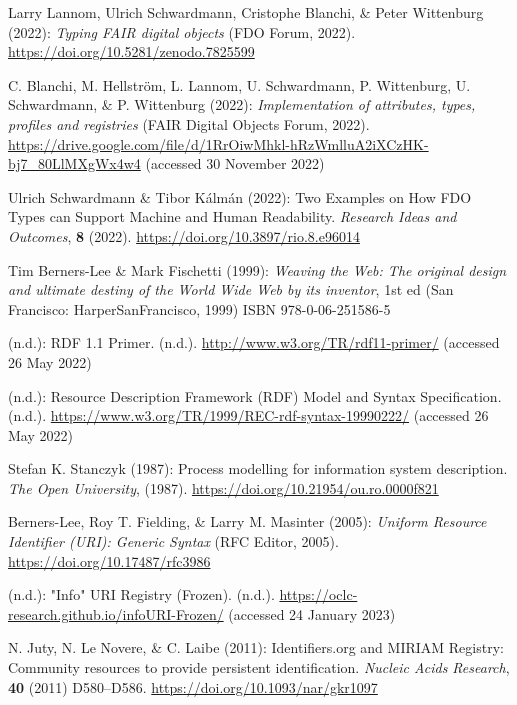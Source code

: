 \begin{thebibliography}{9}
Larry Lannom, Ulrich Schwardmann, Cristophe Blanchi, \& Peter Wittenburg
(2022): \emph{Typing {FAIR} digital objects} ({FDO Forum}, 2022).
\url{https://doi.org/10.5281/zenodo.7825599}

C. Blanchi, M. Hellström, L. Lannom, U. Schwardmann, P. Wittenburg, U.
Schwardmann, \& P. Wittenburg (2022): \emph{Implementation of
attributes, types, profiles and registries} ({FAIR Digital Objects
Forum}, 2022).
\url{https://drive.google.com/file/d/1RrOiwMhkl-hRzWmlluA2iXCzHK-bj7_80LlMXgWx4w4}
(accessed 30 November 2022)

Ulrich Schwardmann \& Tibor Kálmán (2022): Two {Examples} on {How FDO
Types} can {Support Machine} and {Human Readability}. \emph{Research
Ideas and Outcomes}, \textbf{8} (2022).
\url{https://doi.org/10.3897/rio.8.e96014}

Tim Berners-Lee \& Mark Fischetti (1999): \emph{Weaving the {Web}: The
original design and ultimate destiny of the {World Wide Web} by its
inventor}, 1st ed ({San Francisco}: {HarperSanFrancisco}, 1999) ISBN
978-0-06-251586-5

(n.d.): {RDF} 1.1 {Primer}. (n.d.).
\url{http://www.w3.org/TR/rdf11-primer/} (accessed 26 May 2022)

(n.d.): Resource {Description Framework} ({RDF}) {Model} and {Syntax
Specification}. (n.d.).
\url{https://www.w3.org/TR/1999/REC-rdf-syntax-19990222/} (accessed 26
May 2022)

Stefan K. Stanczyk (1987): Process modelling for information system
description. \emph{The Open University}, (1987).
\url{https://doi.org/10.21954/ou.ro.0000f821}

Berners-Lee, Roy T. Fielding, \& Larry M. Masinter (2005): \emph{Uniform
{Resource Identifier} ({URI}): {Generic Syntax}} ({RFC Editor}, 2005).
\url{https://doi.org/10.17487/rfc3986}

(n.d.): "Info" {URI Registry} ({Frozen}). (n.d.).
\url{https://oclc-research.github.io/infoURI-Frozen/} (accessed 24
January 2023)

N. Juty, N. Le Novere, \& C. Laibe (2011): Identifiers.org and {MIRIAM
Registry}: Community resources to provide persistent identification.
\emph{Nucleic Acids Research}, \textbf{40} (2011) D580--D586.
\url{https://doi.org/10.1093/nar/gkr1097}


\end{thebibliography}
